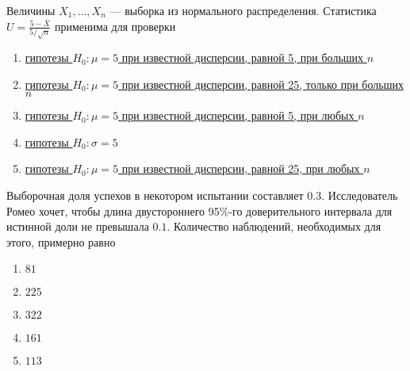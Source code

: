 \documentclass[t]{beamer}
\begin{document}
 \begin{frame} \label{17} 
\begin{block}{17} 

  Величины $X_1,\ldots,X_n$ — выборка из нормального распределения.  Статистика $U=\frac{5-\bar{X}}{5/\sqrt{n}}$ применима для проверки
  


 \end{block} 
\begin{enumerate} 
\item[] \hyperlink{17-No}{\beamergotobutton{} гипотезы $H_0: \mu = 5$ при известной дисперсии, равной 5, при больших $n$}
\item[] \hyperlink{17-No}{\beamergotobutton{} гипотезы $H_0: \mu = 5$ при известной дисперсии, равной 25, только при больших $n$}
\item[] \hyperlink{17-No}{\beamergotobutton{} гипотезы $H_0: \mu = 5$ при известной дисперсии, равной 5, при любых $n$}
\item[] \hyperlink{17-No}{\beamergotobutton{} гипотезы $H_0: \sigma = 5$}
\item[] \hyperlink{17-Yes}{\beamergotobutton{} гипотезы $H_0: \mu = 5$ при известной дисперсии, равной 25, при любых $n$}
\end{enumerate} 
\end{frame} 


 \begin{frame} \label{18} 
\begin{block}{18} 

Выборочная доля успехов в некотором испытании составляет $0.3$. Исследователь Ромео хочет, чтобы длина двустороннего 95\%-го доверительного интервала для истинной доли не превышала $0.1$. Количество наблюдений, необходимых для этого, примерно равно
  


 \end{block} 
\begin{enumerate} 
\item[] \hyperlink{18-No}{\beamergotobutton{} $81$}
\item[] \hyperlink{18-No}{\beamergotobutton{} $225$}
\item[] \hyperlink{18-Yes}{\beamergotobutton{} $322$}
\item[] \hyperlink{18-No}{\beamergotobutton{} $161$}
\item[] \hyperlink{18-No}{\beamergotobutton{} $113$}
\end{enumerate} 
\end{frame} 
\end{document}
